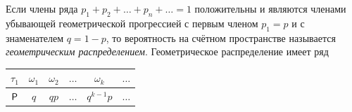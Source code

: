 \begin{definition}
	\label{def:4.17}
Если члены ряда $p_1 + p_2 + \ldots + p_n + \ldots = 1$ положительны и являются членами убывающей геометрической прогрессией с первым членом $p_1 = p$ и с знаменателем $q = 1 − p$, то вероятность на счётном пространстве называется \textit{геометрическим распределением}. Геометрическое распределение имеет ряд
\begin{center}
	\begin{tabular}{|c|c|c|c|c|c|}
		\hline
		$\tau_1$ & $\omega_1$ & $\omega_2$ & $\ldots$ & $\omega_k$ & $\ldots$ \\ \hline
		$\P$  & $q$ & $qp$ & $\ldots$  & $q^{k-1}p$& $\ldots$ \\ \hline
	\end{tabular}
\end{center}
\end{definition}

